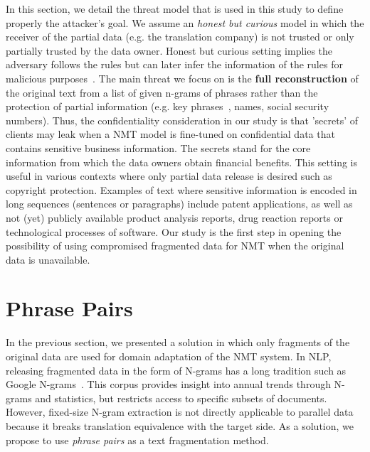 In this section, we detail the threat model that is used in this study to define properly the attacker’s goal. %
We assume an \textit{honest but curious} model in which the receiver of the partial data (e.g. the translation company) is not trusted or only partially trusted by the data owner. Honest but curious setting implies the adversary follows the rules but can later infer the information of the rules for malicious purposes~\parencite{goldreich2009foundations}. The main threat we focus on is the \textbf{full reconstruction} of the original text from a list of given n-grams of phrases rather than the protection of partial information (e.g. key phrases~\parencite{hard2018federated}, names, social security numbers). Thus, the confidentiality consideration in our study is that 'secrets' of clients may leak when a NMT model is fine-tuned on confidential data that contains sensitive business information. The secrets stand for the core information from which the data owners obtain financial benefits. This setting is useful in various contexts where only partial data release is desired such as copyright protection. Examples of text where sensitive information is encoded in long sequences (sentences or paragraphs) include patent applications, as well as not (yet) publicly available product analysis reports, drug reaction reports or technological processes of software. Our study is the first step in opening the possibility of using compromised fragmented data for NMT when the original data is unavailable.


\section{Phrase Pairs}\label{section:phrase_pairs}
In the previous section, we presented a solution in which only fragments of the original data are used for domain adaptation of the NMT system. In NLP, releasing fragmented data in the form of N-grams has a long tradition such as Google N-grams~\parencite{michel2011quantitative}. This corpus provides insight into annual trends through N-grams and statistics, but restricts access to specific subsets of documents. However, fixed-size N-gram extraction is not directly applicable to parallel data because it breaks translation equivalence with the target side. As a solution, we propose to use \textit{phrase pairs} as a text fragmentation method.

